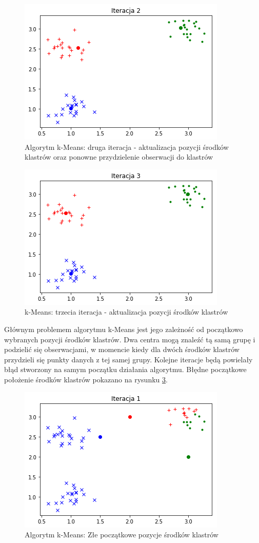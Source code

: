    \begin{figure}[h!]
        \centering
        \includegraphics[width=0.6\linewidth]{Rysunki/Rozdzial2/iteracja2.png}
        \caption{Algorytm k-Means: druga iteracja - aktualizacja pozycji środków klastrów oraz ponowne przydzielenie obserwacji do klastrów}
        \label{fig:kmeans:iteration02}
    \end{figure}
    \newpage
    \begin{figure}[h!]
        \centering
        \includegraphics[width=0.6\linewidth]{Rysunki/Rozdzial2/iteracja3.png}
        \caption{k-Means: trzecia iteracja - aktualizacja pozycji środków klastrów}
        \label{fig:kmeans:iteration03}
    \end{figure}
    Głównym problemem algorytmu k-Means jest jego zależność od początkowo wybranych pozycji środków klastrów. Dwa centra mogą znaleźć tą samą grupę i podzielić się obserwacjami, w momencie kiedy dla dwóch środków klastrów przydzieli się punkty danych z tej samej grupy. Kolejne iteracje będą powielały błąd stworzony na samym początku działania algorytmu. Błędne początkowe położenie środków klastrów pokazano na rysunku \ref{fig:kmeans_bad1}.
    \newpage
    \begin{figure}[h!]
        \centering
    \includegraphics[width=0.6\linewidth]{Rysunki/Rozdzial2/zlaiteracja1.png}
    \caption{Algorytm k-Means: Złe początkowe pozycje środków klastrów}
    \label{fig:kmeans_bad1}
    \end{figure}
    

